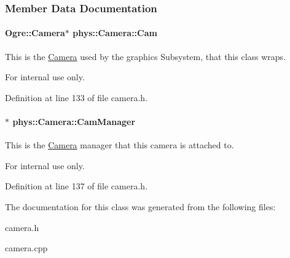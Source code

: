 \subsubsection{Member Data Documentation}
\hypertarget{classphys_1_1Camera_a91622148b9b9a9ae1554c828f7e2fc89}{
\paragraph[{Cam}]{\setlength{\rightskip}{0pt plus 5cm}Ogre::Camera$\ast$ {\bf phys::Camera::Cam}}\hfill}
\label{d9/df8/classphys_1_1Camera_a91622148b9b9a9ae1554c828f7e2fc89}


This is the \hyperlink{classphys_1_1Camera}{Camera} used by the graphics Subsystem, that this class wraps. 

\begin{DoxyInternal}{For internal use only.}
\end{DoxyInternal}


Definition at line 133 of file camera.h.

\hypertarget{classphys_1_1Camera_a909203ede748deb1b587a8758ba8cec4}{
\paragraph[{CamManager}]{$\ast$ {\bf phys::Camera::CamManager}}\hfill}
\label{d9/df8/classphys_1_1Camera_a909203ede748deb1b587a8758ba8cec4}


This is the \hyperlink{classphys_1_1Camera}{Camera} manager that this camera is attached to. 

\begin{DoxyInternal}{For internal use only.}
\end{DoxyInternal}


Definition at line 137 of file camera.h.



The documentation for this class was generated from the following files:\begin{DoxyCompactItemize}
\item 
camera.h\item 
camera.cpp\end{DoxyCompactItemize}
